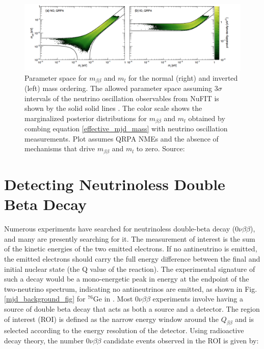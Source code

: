 \begin{figure}[!htb]
\centering
\includegraphics[trim={0.6cm 0cm 1cm 0cm},clip,width=\linewidth]
{ch1/figs/benato_posterior.png}
\caption{Parameter space for $m_{\beta\beta}$ and $m_l$ for the normal (right) and inverted (left) mass ordering. The allowed parameter space assuming $3\sigma$ intervals of the neutrino oscillation observables from NuFIT is shown by the solid solid lines \cite{nufit}. The color scale shows the marginalized posterior distributions for $m_{\beta\beta}$ and $m_l$ obtained by combing equation \ref{effective_mjd_mass} with neutrino
oscillation measurements. Plot assumes QRPA NMEs and the absence of mechanisms that drive $m_{\beta\beta}$ and $m_l$ to zero. Source: \cite{PhysRevD.96.053001}}
\label{majorana_mass}
\end{figure}


\section{Detecting Neutrinoless Double Beta Decay}
Numerous experiments have searched for neutrinoless double-beta decay ($0\nu\beta\beta$), and many are presently searching for it. The measurement of interest is the sum of the kinetic energies of the two emitted electrons. If no antineutrino is emitted, the emitted electrons should carry the full energy difference between the final and initial nuclear state (the Q value of the reaction). The experimental signature of such a decay would be a mono-energetic peak in energy at the endpoint of the two-neutrino spectrum, indicating no antineutrinos are emitted, as shown in Fig. \ref{mjd_background_fig} for ${}^{76}\mathrm{Ge}$ in {\MJD}. Most $0\nu\beta\beta$ experiments involve having a source of double beta decay that acts as both a source and a detector. The region of interest (ROI) is defined as the narrow energy window around the $Q_{\beta\beta}$ and is selected according to the energy resolution of the detector. Using radioactive decay theory, the number $0\nu\beta\beta$ candidate events observed in the ROI is given by: %

